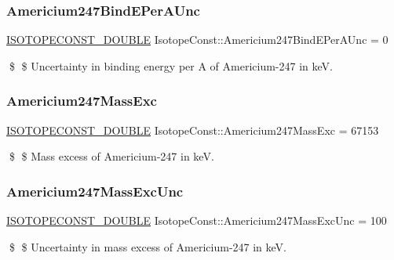 \subsubsection{\texorpdfstring{Americium247\+Bind\+E\+Per\+A\+Unc}{Americium247BindEPerAUnc}}
{\footnotesize\ttfamily \mbox{\hyperlink{group___isotope_const-_macros_ga8f45a7272ce02c0b4c65c44636ed719a}{I\+S\+O\+T\+O\+P\+E\+C\+O\+N\+S\+T\+\_\+\+D\+O\+U\+B\+LE}} Isotope\+Const\+::\+Americium247\+Bind\+E\+Per\+A\+Unc = 0}

\$ \$ Uncertainty in binding energy per A of Americium-\/247 in keV. \mbox{\label{group___isotope_const-_americium-_am247_gab519cf6d097ce0758f6f33c628a9345c}} 
\subsubsection{\texorpdfstring{Americium247\+Mass\+Exc}{Americium247MassExc}}
{\footnotesize\ttfamily \mbox{\hyperlink{group___isotope_const-_macros_ga8f45a7272ce02c0b4c65c44636ed719a}{I\+S\+O\+T\+O\+P\+E\+C\+O\+N\+S\+T\+\_\+\+D\+O\+U\+B\+LE}} Isotope\+Const\+::\+Americium247\+Mass\+Exc = 67153}

\$ \$ Mass excess of Americium-\/247 in keV. \mbox{\label{group___isotope_const-_americium-_am247_ga8608fd19550b42295250cd262cdbc231}} 
\subsubsection{\texorpdfstring{Americium247\+Mass\+Exc\+Unc}{Americium247MassExcUnc}}
{\footnotesize\ttfamily \mbox{\hyperlink{group___isotope_const-_macros_ga8f45a7272ce02c0b4c65c44636ed719a}{I\+S\+O\+T\+O\+P\+E\+C\+O\+N\+S\+T\+\_\+\+D\+O\+U\+B\+LE}} Isotope\+Const\+::\+Americium247\+Mass\+Exc\+Unc = 100}

\$ \$ Uncertainty in mass excess of Americium-\/247 in keV. \mbox{\label{group___isotope_const-_americium-_am247_gaae3669d113db8a99e1f7cdb9d22f05de}} 
